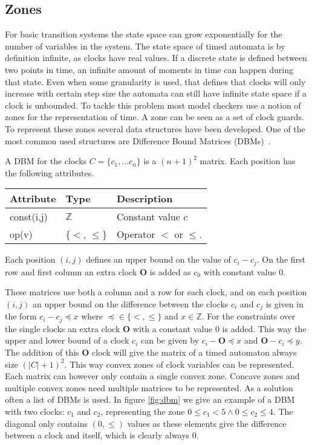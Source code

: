\subsection{Zones}
For basic transition systems the state space can grow exponentially for the number of variables in the system. The state space of timed automata is by definition infinite, as clocks have real values. If a discrete state is defined between two points in time, an infinite amount of moments in time can happen during that state. Even when some granularity is used, that defines that clocks will only increase with certain step size the automata can still have infinite state space if a clock is unbounded. To tackle this problem most model checkers use a notion of zones for the representation of time. A zone can be seen as a set of clock guards. To represent these zones several data structures have been developed. One of the most common used structures are Difference Bound Matrices (DBMs)~\cite{dbmorig,bengtsson2002clocks}.

\begin{mydef}
A DBM for the clocks $C = \{c_1,...c_n\}$ is a $(n+1)^2$ matrix. Each position has the following attributes.

\begin{tabular}{lll}
Attribute                & Type                      & Description                                           \\\hline
const(i,j)               & $\mathbb{Z}$             & Constant value $c$ \\
op(v)                    & \{$<$, $\leq\}$     & Operator $<$ or $\leq$.                         \\
\end{tabular}

Each position $(i,j)$ defines an upper bound on the value of $c_i - c_j$. On the first row and first column an extra clock $\mathbf{O}$ is added as $c_0$ with constant value 0. 
\end{mydef}
 
These matrices use both a column and a row for each clock, and on each position $(i,j)$ an upper bound on the difference between the clocks $c_i$ and $c_j$ is given in the form $c_i - c_j \preceq x$ where $\preceq \in \{<, \leq\}$ and $x \in \mathbb{Z}$. For the constraints over the single clocks an extra clock $\mathbf{O}$ with a constant value 0 is added. This way the upper and lower bound of a clock $c_i$ can be given by $c_i - \mathbf{O} \preceq x$ and $\mathbf{O} - c_i \preceq y$. The addition of this $\mathbf{O}$ clock will give the matrix of a timed automaton always size $(|C|+1)^2$. This way convex zones of clock variables can be represented. Each matrix can however only contain a single convex zone. Concave zones and multiple convex zones need multiple matrices to be represented. As a solution often a list of DBMs is used. In figure \ref{fig:dbm} we give an example of a DBM with two clocks: $c_1$ and $c_2$, representing the zone $0 \leq c_1 < 5 \wedge 0 \leq c_2 \leq 4$. The diagonal only contains $(0,\leq)$ values as these elements give the difference between a clock and itself, which is clearly always 0.

